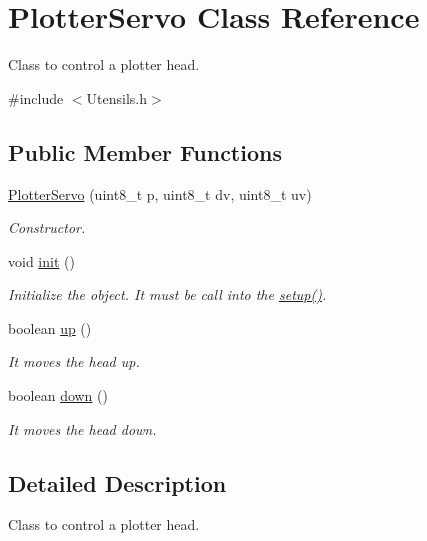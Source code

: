 \hypertarget{class_plotter_servo}{\section{Plotter\+Servo Class Reference}
\label{class_plotter_servo}
}


Class to control a plotter head.  




{\ttfamily \#include $<$Utensils.\+h$>$}

\subsection*{Public Member Functions}
\begin{DoxyCompactItemize}
\item 
\hyperlink{class_plotter_servo_a3e1bb246a0c6b6df9f78b1a5a9343ef0}{Plotter\+Servo} (uint8\+\_\+t p, uint8\+\_\+t dv, uint8\+\_\+t uv)
\begin{DoxyCompactList}\small\item\em Constructor. \end{DoxyCompactList}\item 
void \hyperlink{class_plotter_servo_ad35c8f57eaeeffa768340a777c105aeb}{init} ()
\begin{DoxyCompactList}\small\item\em Initialize the object. It must be call into the \hyperlink{easy___c_n_c_8cpp_a4fc01d736fe50cf5b977f755b675f11d}{setup()}. \end{DoxyCompactList}\item 
boolean \hyperlink{class_plotter_servo_ab3d7dc74cd89c962a9cf27bdd210653f}{up} ()
\begin{DoxyCompactList}\small\item\em It moves the head up. \end{DoxyCompactList}\item 
boolean \hyperlink{class_plotter_servo_a06411670f5c5799ec84be0cffda3772b}{down} ()
\begin{DoxyCompactList}\small\item\em It moves the head down. \end{DoxyCompactList}\end{DoxyCompactItemize}


\subsection{Detailed Description}
Class to control a plotter head. 

